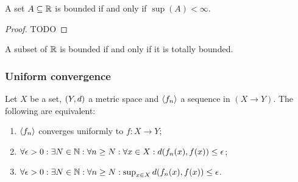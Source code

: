 \begin{proposition} \label{boundedSubsetsRealNumbers}
A set $A\subseteq \mathbb{R}$ is bounded \textup{if and only if} $\sup(A) < \infty$.
\end{proposition}
\begin{proof}
TODO
\end{proof}

\begin{lemma} \label{realBoundedIffTotallyBounded}
A subset of $\mathbb{R}$ is bounded \textup{if and only if} it is totally bounded.
\end{lemma}

\subsubsection{Uniform convergence}
\begin{proposition}
Let $X$ be a set, $\left( Y,d \right)$ a metric space and $\left\langle f_n \right\rangle$ a sequence in $(X\to Y)$. The following are equivalent:
\begin{enumerate}
\item  $\left\langle f_n \right\rangle$ converges uniformly to $f: X\to Y$;
\item $\forall \epsilon > 0: \exists N\in \mathbb{N}: \forall n \geq N: \forall x\in X:  d(f_n(x), f(x)) \leq \epsilon$;
\item $\forall \epsilon > 0: \exists N\in \mathbb{N}: \forall n \geq N: \sup_{x\in X} d(f_n(x), f(x)) \leq \epsilon$.
\end{enumerate}
\end{proposition}
